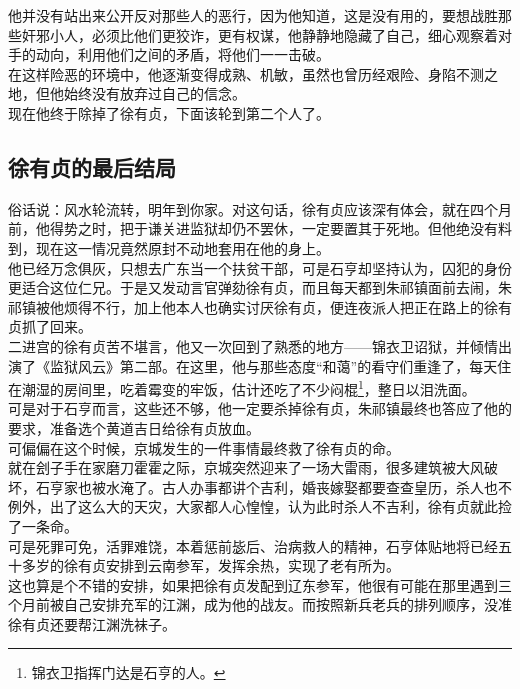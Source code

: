 \begin{multicols}{\theparacolNo}
他并没有站出来公开反对那些人的恶行，因为他知道，这是没有用的，要想战胜那些奸邪小人，必须比他们更狡诈，更有权谋，他静静地隐藏了自己，细心观察着对手的动向，利用他们之间的矛盾，将他们一一击破。\\

在这样险恶的环境中，他逐渐变得成熟、机敏，虽然也曾历经艰险、身陷不测之地，但他始终没有放弃过自己的信念。\\

现在他终于除掉了徐有贞，下面该轮到第二个人了。\\

\subsection{徐有贞的最后结局}
俗话说：风水轮流转，明年到你家。对这句话，徐有贞应该深有体会，就在四个月前，他得势之时，把于谦关进监狱却仍不罢休，一定要置其于死地。但他绝没有料到，现在这一情况竟然原封不动地套用在他的身上。\\

他已经万念俱灰，只想去广东当一个扶贫干部，可是石亨却坚持认为，囚犯的身份更适合这位仁兄。于是又发动言官弹劾徐有贞，而且每天都到朱祁镇面前去闹，朱祁镇被他烦得不行，加上他本人也确实讨厌徐有贞，便连夜派人把正在路上的徐有贞抓了回来。\\

二进宫的徐有贞苦不堪言，他又一次回到了熟悉的地方——锦衣卫诏狱，并倾情出演了《监狱风云》第二部。在这里，他与那些态度“和蔼”的看守们重逢了，每天住在潮湿的房间里，吃着霉变的牢饭，估计还吃了不少闷棍\footnote{锦衣卫指挥门达是石亨的人。}，整日以泪洗面。\\

可是对于石亨而言，这些还不够，他一定要杀掉徐有贞，朱祁镇最终也答应了他的要求，准备选个黄道吉日给徐有贞放血。\\

可偏偏在这个时候，京城发生的一件事情最终救了徐有贞的命。\\

就在刽子手在家磨刀霍霍之际，京城突然迎来了一场大雷雨，很多建筑被大风破坏，石亨家也被水淹了。古人办事都讲个吉利，婚丧嫁娶都要查查皇历，杀人也不例外，出了这么大的天灾，大家都人心惶惶，认为此时杀人不吉利，徐有贞就此捡了一条命。\\

可是死罪可免，活罪难饶，本着惩前毖后、治病救人的精神，石亨体贴地将已经五十多岁的徐有贞安排到云南参军，发挥余热，实现了老有所为。\\

这也算是个不错的安排，如果把徐有贞发配到辽东参军，他很有可能在那里遇到三个月前被自己安排充军的江渊，成为他的战友。而按照新兵老兵的排列顺序，没准徐有贞还要帮江渊洗袜子。\\


\end{multicols}

